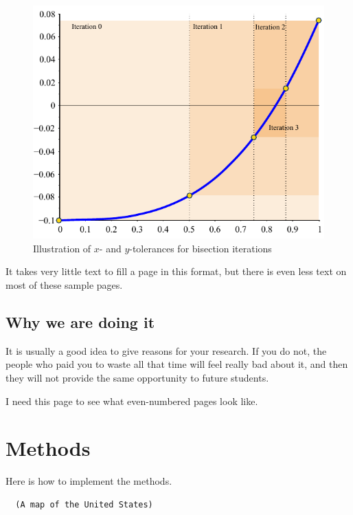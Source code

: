 \documentclass[thesis]{./tex/thesis-umich}
\begin{document}
\begin{figure}
 \begin{center}
  \includegraphics[scale=1]{./pics/f1_tol.pdf}
 \end{center}
 \caption{ \label{fig:fn:tol}
  Illustration of $x$- and $y$-tolerances for bisection iterations}
\end{figure}

\newpage

It takes very little text to fill a page in this format, but there is even less text on most of these sample pages.

\section{Why we are doing it}
It is usually a good idea to give reasons for your research.  If you do not, the people who paid you to waste all that time will feel really bad about it, and then they will not provide the same opportunity to future students.

\newpage

I need this page to see what even-numbered pages look like.

\appendix
\chapter{Methods}
Here is how to implement the methods.

\begin{program}
 \begin{verbatim}
  (A map of the United States)
 \end{verbatim}
 \caption{Map of the United States}
\end{program}
\end{document}

